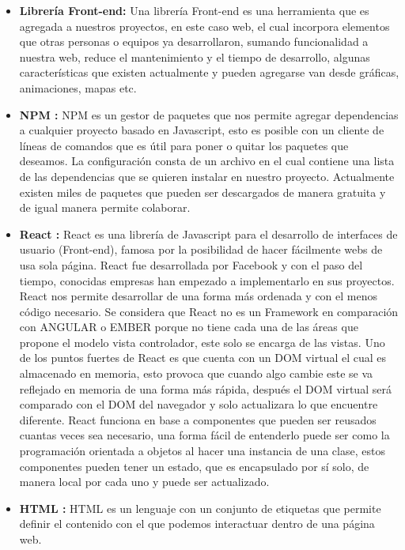     \begin{itemize}
    
    	\item \textbf{Librería Front-end:} Una librería Front-end es una herramienta que es agregada a nuestros proyectos, en este caso web, el cual incorpora elementos que otras personas o equipos ya desarrollaron, sumando funcionalidad a nuestra web, reduce el mantenimiento y el tiempo de desarrollo, algunas características que existen actualmente y pueden agregarse van desde gráficas, animaciones, mapas etc. 
      
       \item \textbf{NPM :} NPM es un gestor de paquetes que nos permite agregar dependencias a cualquier proyecto basado en Javascript, esto es posible con un cliente de líneas de comandos que es útil para poner o quitar los paquetes que deseamos. La configuración consta de un archivo en el cual contiene una lista de las dependencias que se quieren instalar en nuestro proyecto. Actualmente existen miles de paquetes que pueden ser descargados de manera gratuita y de igual manera permite colaborar. 
       
       \item \textbf{ React :} React es una librería de Javascript para el desarrollo de interfaces de usuario (Front-end), famosa por la posibilidad de hacer fácilmente webs de usa sola página. React fue desarrollada por Facebook y con el paso del tiempo, conocidas empresas han empezado a implementarlo en sus proyectos. 
    React nos permite desarrollar de una forma más ordenada y con el menos código necesario. 
    Se considera que React no es un Framework en comparación con ANGULAR o EMBER porque no tiene cada una de las áreas que propone el modelo vista controlador, este solo se encarga de las vistas. 
    Uno de los puntos fuertes de React es que cuenta con un DOM virtual el cual es almacenado en memoria, esto provoca que cuando algo cambie este se va reflejado en memoria de una forma más rápida, después el DOM virtual será comparado con el DOM del navegador y solo actualizara lo que encuentre diferente. 
    React funciona en base a componentes que pueden ser reusados cuantas veces sea necesario, una forma fácil de entenderlo puede ser como la programación orientada a objetos al hacer una instancia de una clase, estos componentes pueden tener un estado, que es encapsulado por sí solo, de manera local por cada uno y puede ser actualizado.  
    
       \item \textbf{HTML  :}   HTML es un lenguaje con un conjunto de etiquetas que permite definir el contenido con el que podemos interactuar dentro de una página web. 
       

\end{itemize}
